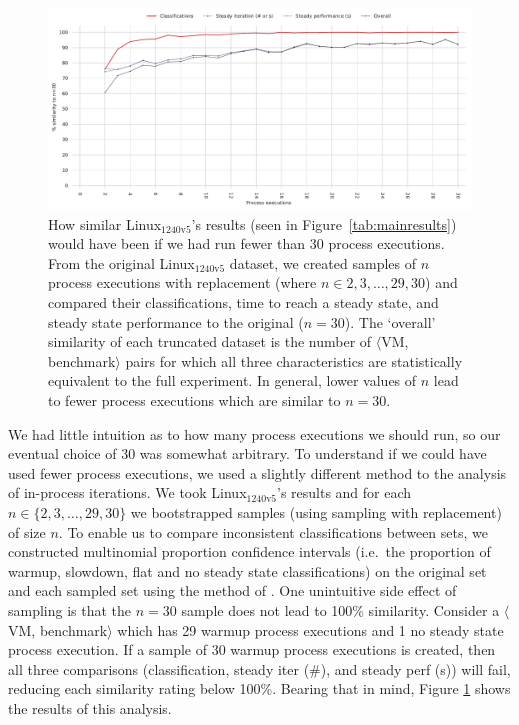 \documentclass[acmsmall,screen]{acmart}
\newcommand{\bencherseven}{Linux$_\mathrm{1240v5}$\xspace}
\newcommand{\vmbpair}{$\langle$VM, benchmark$\rangle$\xspace}
\newcommand{\numpexecs}{30\xspace}
\begin{document}
\begin{figure}[tbp]
\centering
\includegraphics[width=\textwidth]{examples/truncated_pexecs_plot.pdf}
\caption{How similar \bencherseven's results (seen in Figure~\ref{tab:mainresults})
would have been if we had run fewer than
\numpexecs process executions. From the original \bencherseven dataset, we created  samples
of $n$ process executions with replacement (where $n \in {2, 3, \ldots, 29,
30}$) and compared their classifications, time to reach a steady state, and
steady state performance to the original ($n=30$). The `overall' similarity of
each truncated dataset is the number of \vmbpair pairs for which all three
characteristics are statistically equivalent to the full experiment. In general,
lower values of $n$ lead to fewer process executions which are similar to
$n=30$.} \label{fig:pexecstruncated}
\end{figure}

We had little intuition as to how many process executions we should run, so our
eventual choice of \numpexecs was somewhat arbitrary. To understand if we could
have used fewer process executions, we used a slightly different method
to the analysis of in-process iterations. We took \bencherseven's results and
for each $n \in \{2, 3, \ldots, 29, 30\}$ we bootstrapped 
samples (using sampling with replacement) of size $n$. To enable us to compare
inconsistent classifications between sets, we constructed multinomial proportion confidence
intervals (i.e.~the proportion of warmup, slowdown, flat and no
steady state classifications) on the original set and each sampled set using the
method of \cite{sison95simultaneous}. One unintuitive side effect of sampling is that
the $n=30$ sample does not lead to 100\% similarity. Consider a \vmbpair
which has 29 warmup process executions and 1 no steady state process execution.
If a sample of 30 warmup process executions is created, then all three
comparisons (classification, steady iter (\#), and steady perf (s)) will fail,
reducing each similarity rating below 100\%. Bearing that in mind, Figure
\ref{fig:pexecstruncated} shows the results of this analysis.
\end{document}
